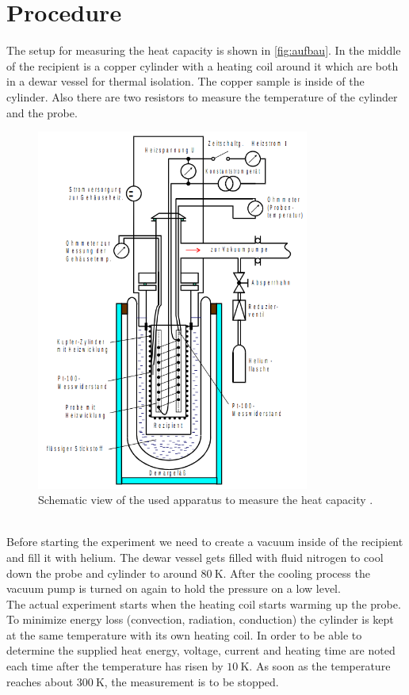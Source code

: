 \section{Procedure}
\label{sec:Durchführung}

The setup for measuring the heat capacity is shown in \autoref{fig:aufbau}.
In the middle of the recipient is a copper cylinder with a heating coil around it which are both in a dewar vessel for thermal isolation.
The copper sample is inside of the cylinder.
Also there are two resistors to measure the temperature of the cylinder and the probe.
\begin{figure}
    \centering
    \includegraphics[width=0.8\textwidth]{content/plots/aufbau.png}
    \caption{Schematic view of the used apparatus to measure the heat capacity \cite{V47}.}
    \label{fig:aufbau}
\end{figure}
\\
Before starting the experiment we need to create a vacuum inside of the recipient and fill it with helium.
The dewar vessel gets filled with fluid nitrogen to cool down the probe and cylinder to around $\qty{80}{\kelvin}$.
After the cooling process the vacuum pump is turned on again to hold the pressure on a low level.
\\
The actual experiment starts when the heating coil starts warming up the probe.
To minimize energy loss (convection, radiation, conduction) the cylinder is kept at the same temperature with its own heating coil.
In order to be able to determine the supplied heat energy, voltage, current and heating time are noted each time after the temperature has risen by $\qty{10}{\kelvin}$.
As soon as the temperature reaches about $\qty{300}{\kelvin}$, the measurement is to be stopped.